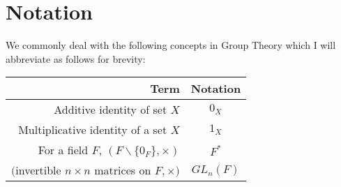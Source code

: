 \section{Notation}

We commonly deal with the following concepts in Group Theory
which I will abbreviate as follows for brevity:
\begin{center}
    \begin{tabular}{ | r | c | }
        \hline
        Term & Notation \\
        \hline \hline
        Additive identity of set $X$ & $0_X$ \\
        Multiplicative identity of a set $X$ & $1_X$ \\
        For a field $F$, $(F \backslash \{0_F\}, \times)$ & $F^*$ \\
        $($invertible $n \times n$ matrices on $F$,$\,\times)$ & $GL_n(F)$ \\
        \hline
    \end{tabular}
\end{center}